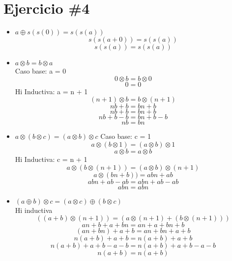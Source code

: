 \documentclass[12pt,letterpaper]{article}
\begin{document}
\section{Ejercicio \#4}
\begin{itemize}
		\item{$a\oplus s(s(0))=s(s(a))$}
		\[
			s(s(a + 0)) = s(s(a))
		\]
		\[
			s(s(a)) = s(s(a))
		\]
		
        \item{$a \otimes b = b \otimes a$}\\
        Caso base: a = 0
        \[
			0 \otimes b = b \otimes 0
        \]
        \[
			0 = 0
        \]
        Hi Inductiva: a = n + 1
        \[
			(n + 1) \otimes b = b \otimes (n + 1)			       
        \]
        \[
			nb + b = bn + b        
        \]
        \[
			nb + b = bn + b        
        \]
        \[
			nb + b - b = bn + b - b        
        \]
        \[
			nb = bn       
        \]
        \item{$a \otimes (b \otimes c)=(a\otimes b)\otimes c$}
        Caso base: c = 1
        \[
			  a \otimes (b \otimes 1) = (a \otimes b) \otimes 1      
        \]
        \[
			  a \otimes b = a \otimes b 
        \]
        Hi Inductiva: c = n + 1
        \[
			a \otimes (b \otimes (n + 1)) = (a \otimes b) \otimes (n + 1)		        
        \]
        \[
			a \otimes (bn + b)) = abn + ab		        
        \]
        \[
			abn + ab - ab = abn + ab - ab		        
        \]
        \[
			abn = abn		        
        \]
        \item{$(a\oplus b)\otimes c = (a\otimes c) \oplus (b \otimes c)$}\\
        Hi inductiva
        \[
			((a + b) \otimes (n + 1)) = (a \otimes (n + 1) + (b \otimes (n + 1)))        
        \]
        \[
			an + b + a + bn = an + a + bn + b        
        \]
        \[
			(an + bn) + a + b = an + bn + a + b
        \]
        \[
			n(a + b) + a + b = n(a + b) + a + b			
        \]
        \[
			n(a + b) + a + b - a - b = n(a + b) + a + b - a - b			
        \]
        \[
			n(a + b) = n(a + b)			
        \]
\end{itemize}
\end{document}
